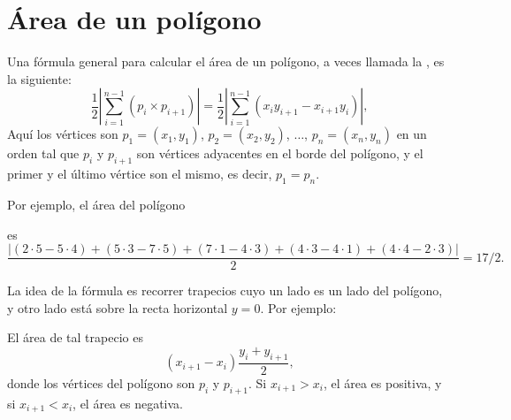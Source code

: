 \section{Área de un polígono}

Una fórmula general para calcular el área
de un polígono, a veces llamada la ,
es la siguiente: 
\[\frac{1}{2} |\sum_{i=1}^{n-1} (p_i \times p_{i+1})| =
\frac{1}{2} |\sum_{i=1}^{n-1} (x_i y_{i+1} - x_{i+1} y_i)|, \]
Aquí los vértices son
$p_1=(x_1,y_1)$, $p_2=(x_2,y_2)$, $\ldots$, $p_n=(x_n,y_n)$
en un orden tal que
$p_i$ y $p_{i+1}$ son vértices adyacentes en el borde
del polígono,
y el primer y el último vértice son el mismo, es decir, $p_1=p_n$.

Por ejemplo, el área del polígono
\begin{center}
\end{center}
es
\[\frac{|(2\cdot5-5\cdot4)+(5\cdot3-7\cdot5)+(7\cdot1-4\cdot3)+(4\cdot3-4\cdot1)+(4\cdot4-2\cdot3)|}{2} = 17/2.\]

La idea de la fórmula es recorrer trapecios
cuyo un lado es un lado del polígono,
y otro lado está sobre la recta horizontal $y=0$.
Por ejemplo:
\begin{center}
\end{center}
El área de tal trapecio es
\[(x_{i+1}-x_{i}) \frac{y_i+y_{i+1}}{2},\]
donde los vértices del polígono son $p_i$ y $p_{i+1}$.
Si $x_{i+1}>x_{i}$, el área es positiva,
y si $x_{i+1}<x_{i}$, el área es negativa.

